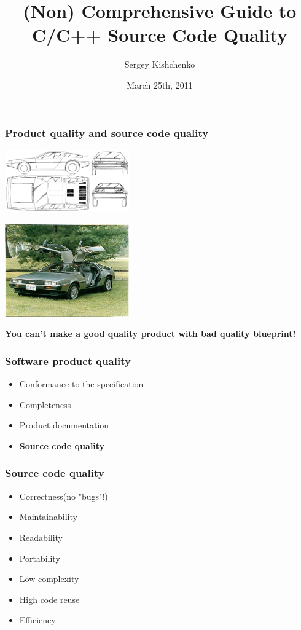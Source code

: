 \documentclass{beamer}
\title{(Non) Comprehensive Guide to C/C++ Source Code Quality}
\author{Sergey Kishchenko}
\date{March 25th, 2011}
\institute{Quickoffice}
\begin{document}
\frame{\titlepage}
\begin{frame} 
\frametitle{Product quality and source code quality}
\begin{multicols}{2}

\includegraphics[width=0.4\textwidth]{img/delorean-blueprint}
\columnbreak
{}

\includegraphics[width=0.4\textwidth]{img/delorean}
\end{multicols}
\begin{center}
\textbf{You can't make a good quality product with bad quality blueprint!}
\end{center}
\end{frame} 

\begin{frame}
\frametitle{Software product quality}
\begin{itemize}
\item Conformance to the specification
\item Completeness
\item Product documentation
\item \textbf{Source code quality}
\end{itemize}
\end{frame}

\begin{frame}
\frametitle{Source code quality}
\begin{itemize}
\item Correctness(no "bugs"!)
\item Maintainability
\item Readability
\item Portability
\item Low complexity
\item High code reuse
\item Efficiency
\end{itemize}
\end{frame}
\end{document}
